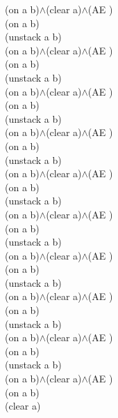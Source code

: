 {{(on a b)$\wedge$(clear a)$\wedge$(AE )\\
(on a b)\\
(unstack a b)\\
(on a b)$\wedge$(clear a)$\wedge$(AE )\\
(on a b)\\
(unstack a b)\\
(on a b)$\wedge$(clear a)$\wedge$(AE )\\
(on a b)\\
(unstack a b)\\
(on a b)$\wedge$(clear a)$\wedge$(AE )\\
(on a b)\\
(unstack a b)\\
(on a b)$\wedge$(clear a)$\wedge$(AE )\\
(on a b)\\
(unstack a b)\\
(on a b)$\wedge$(clear a)$\wedge$(AE )\\
(on a b)\\
(unstack a b)\\
(on a b)$\wedge$(clear a)$\wedge$(AE )\\
(on a b)\\
(unstack a b)\\
(on a b)$\wedge$(clear a)$\wedge$(AE )\\
(on a b)\\
(unstack a b)\\
(on a b)$\wedge$(clear a)$\wedge$(AE )\\
(on a b)\\
(unstack a b)\\
(on a b)$\wedge$(clear a)$\wedge$(AE )\\
(on a b)\\
(clear a)\\
}%
}

